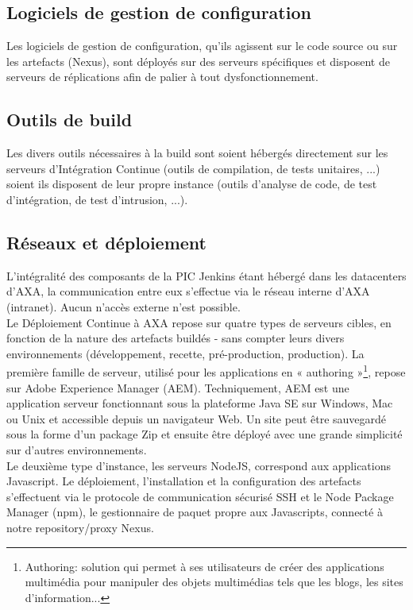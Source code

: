    \subsection{Logiciels de gestion de configuration}
    Les logiciels de gestion de configuration, qu'ils agissent sur le code source ou sur les artefacts (Nexus), sont déployés sur des serveurs spécifiques et disposent de serveurs de réplications afin de palier à tout dysfonctionnement.

    \subsection{Outils de build}
    Les divers outils nécessaires à la build sont soient hébergés directement sur les serveurs d'Intégration Continue (outils de compilation, de tests unitaires, ...) soient ils disposent de leur propre instance (outils d'analyse de code, de test d'intégration, de test d'intrusion, ...).

    \subsection{Réseaux et déploiement}
    L'intégralité des composants de la PIC Jenkins étant hébergé dans les datacenters d'AXA, la communication entre eux s'effectue via le réseau interne d'AXA (intranet). Aucun n'accès externe n'est possible.\\

    Le Déploiement Continue à AXA repose sur quatre types de serveurs cibles, en fonction de la nature des artefacts buildés - sans compter leurs divers environnements (développement, recette, pré-production, production). La première famille de serveur, utilisé pour les applications en « \gls{authoring} »\footnote{Authoring: solution qui permet à ses utilisateurs de créer des applications multimédia pour manipuler des objets multimédias tels que les blogs, les sites d'information...}, repose sur Adobe Experience Manager (\gls{AEM}). Techniquement, AEM est une application serveur fonctionnant sous la plateforme Java SE sur Windows, Mac ou Unix et accessible depuis un navigateur Web. Un site peut être sauvegardé sous la forme d’un package Zip et ensuite être déployé avec une grande simplicité sur d’autres environnements.\\

    Le deuxième type d'instance, les serveurs NodeJS, correspond aux applications Javascript. Le déploiement, l'installation et la configuration des artefacts s'effectuent via le protocole de communication sécurisé SSH et le Node Package Manager (\gls{npm}), le gestionnaire de paquet propre aux Javascripts, connecté à notre repository/proxy Nexus.\\

